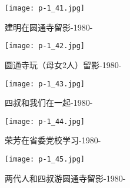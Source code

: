 \clearpage


\begin{figure}
    \begin{center}
        \texttt{[image: p-1\_41.jpg]}
        \begin{shaded}
            \caption{建明在圆通寺留影-1980-}
        \end{shaded}
    \end{center}
\end{figure}

\clearpage


\begin{figure}
    \begin{center}
        \texttt{[image: p-1\_42.jpg]}
        \begin{shaded}
            \caption{圆通寺玩（母女2人）留影-1980-}
        \end{shaded}
    \end{center}
\end{figure}

\clearpage


\begin{figure}
    \begin{center}
        \texttt{[image: p-1\_43.jpg]}
        \begin{shaded}
            \caption{四叔和我们在一起-1980-}
        \end{shaded}
    \end{center}
\end{figure}

\clearpage


\begin{figure}
    \begin{center}
        \texttt{[image: p-1\_44.jpg]}
        \begin{shaded}
            \caption{荣芳在省委党校学习-1980-}
        \end{shaded}
    \end{center}
\end{figure}

\clearpage


\begin{figure}
    \begin{center}
        \texttt{[image: p-1\_45.jpg]}
        \begin{shaded}
            \caption{两代人和四叔游圆通寺留影-1980-}
        \end{shaded}
    \end{center}
\end{figure}

